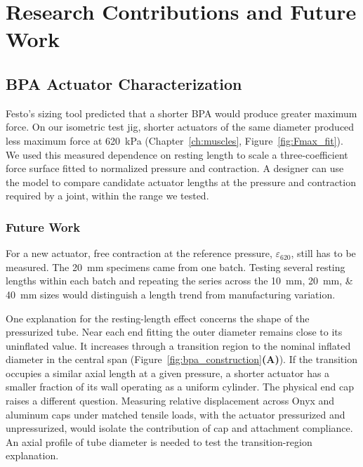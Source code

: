 \section{Research Contributions and Future Work}

\subsection{BPA Actuator Characterization}

Festo's sizing tool predicted that a shorter BPA would produce greater maximum force. On our isometric test jig, shorter actuators of the same diameter produced less maximum force at \qty{620}{\kPa} (Chapter~\ref{ch:muscles}, Figure~\ref{fig:Fmax_fit}). We used this measured dependence on resting length to scale a three-coefficient force surface fitted to normalized pressure and contraction. A designer can use the model to compare candidate actuator lengths at the pressure and contraction required by a joint, within the range we tested.

\subsubsection{Future Work}\label{sec:fw_bpa}

For a new actuator, free contraction at the reference pressure, $\varepsilon_{620}$, still has to be measured. The \qty{20}{\mm} specimens came from one batch. Testing several resting lengths within each batch and repeating the series across the \qtylist{10;20;40}{\mm} sizes would distinguish a length trend from manufacturing variation.

One explanation for the resting-length effect concerns the shape of the pressurized tube. Near each end fitting the outer diameter remains close to its uninflated value. It increases through a transition region to the nominal inflated diameter in the central span (Figure~\ref{fig:bpa_construction}\textbf{(A)}). If the transition occupies a similar axial length at a given pressure, a shorter actuator has a smaller fraction of its wall operating as a uniform cylinder. The physical end cap raises a different question. Measuring relative displacement across Onyx and aluminum caps under matched tensile loads, with the actuator pressurized and unpressurized, would isolate the contribution of cap and attachment compliance. An axial profile of tube diameter is needed to test the transition-region explanation.

